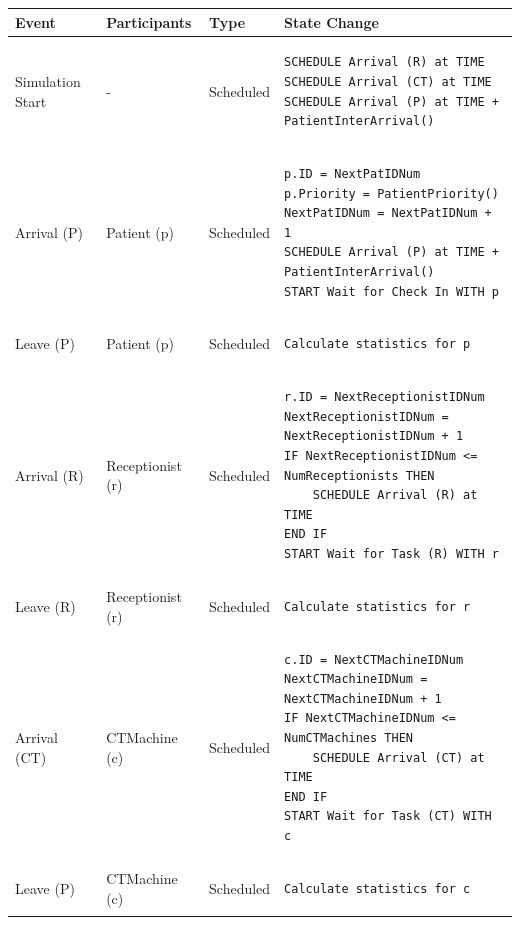 \documentclass[
  10pt,
  a4paperpaper,
  DIV=11,
  numbers=noendperiod,
  oneside]{scrreprt}
\begin{document}
\begin{longtable}{@{}>{\raggedright\arraybackslash}p{1.5cm}>{\raggedright\arraybackslash}p{2.1cm}>{\raggedright\arraybackslash}p{2.2cm}>{\raggedright\arraybackslash}p{10cm}@{}}
  \toprule
  Event          & Participants & Type       & State Change \\ \midrule
  \endhead
  Simulation Start & -  & Scheduled  & 
  \begin{lstlisting}[language=CMPseudo]
SCHEDULE Arrival (R) at TIME
SCHEDULE Arrival (CT) at TIME
SCHEDULE Arrival (P) at TIME + PatientInterArrival()
  \end{lstlisting}
  \\ \midrule
  Arrival (P) & Patient (p)  & Scheduled  & 
  \begin{lstlisting}[language=CMPseudo]
p.ID = NextPatIDNum
p.Priority = PatientPriority()
NextPatIDNum = NextPatIDNum + 1
SCHEDULE Arrival (P) at TIME + PatientInterArrival()
START Wait for Check In WITH p
  \end{lstlisting}
  \\ \midrule
  Leave (P) & Patient (p)  & Scheduled  & 
  \begin{lstlisting}[language=CMPseudo]
Calculate statistics for p
  \end{lstlisting}
  \\ \midrule
  Arrival (R) & Receptionist (r)  & Scheduled  & 
  \begin{lstlisting}[language=CMPseudo]
r.ID = NextReceptionistIDNum
NextReceptionistIDNum = NextReceptionistIDNum + 1
IF NextReceptionistIDNum <= NumReceptionists THEN
    SCHEDULE Arrival (R) at TIME
END IF
START Wait for Task (R) WITH r
  \end{lstlisting}
  \\ \midrule
  Leave (R) & Receptionist (r)  & Scheduled  & 
  \begin{lstlisting}[language=CMPseudo]
Calculate statistics for r
  \end{lstlisting}
  \\ \midrule
  Arrival (CT) & CTMachine (c)  & Scheduled  & 
  \begin{lstlisting}[language=CMPseudo]
c.ID = NextCTMachineIDNum
NextCTMachineIDNum = NextCTMachineIDNum + 1
IF NextCTMachineIDNum <= NumCTMachines THEN
    SCHEDULE Arrival (CT) at TIME
END IF
START Wait for Task (CT) WITH c
  \end{lstlisting}
  \\ \midrule
  Leave (P) & CTMachine (c)  & Scheduled  & 
  \begin{lstlisting}[language=CMPseudo]
Calculate statistics for c
  \end{lstlisting}
  \\ \bottomrule
  

\end{longtable}
\end{document}
